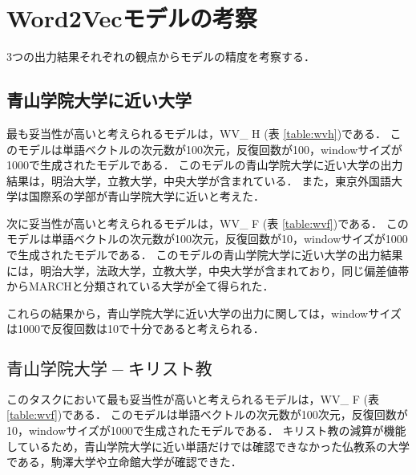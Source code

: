 \section{Word2Vecモデルの考察}
3つの出力結果それぞれの観点からモデルの精度を考察する．

\subsection{青山学院大学に近い大学}
最も妥当性が高いと考えられるモデルは，WV\_ H (表 \ref{table:wvh})である．
このモデルは単語ベクトルの次元数が100次元，反復回数が100，windowサイズが1000で生成されたモデルである．
このモデルの青山学院大学に近い大学の出力結果は，明治大学，立教大学，中央大学が含まれている．
また，東京外国語大学は国際系の学部が青山学院大学に近いと考えた．

次に妥当性が高いと考えられるモデルは，WV\_ F (表 \ref{table:wvf})である．
このモデルは単語ベクトルの次元数が100次元，反復回数が10，windowサイズが1000で生成されたモデルである．
このモデルの青山学院大学に近い大学の出力結果には，明治大学，法政大学，立教大学，中央大学が含まれており，同じ偏差値帯からMARCHと分類されている大学が全て得られた．




これらの結果から，青山学院大学に近い大学の出力に関しては，windowサイズは1000で反復回数は10で十分であると考えられる．

\subsection{$ 青山学院大学 - キリスト教 $}
このタスクにおいて最も妥当性が高いと考えられるモデルは，WV\_ F (表 \ref{table:wvf})である．
このモデルは単語ベクトルの次元数が100次元，反復回数が10，windowサイズが1000で生成されたモデルである．
キリスト教の減算が機能しているため，青山学院大学に近い単語だけでは確認できなかった仏教系の大学である，駒澤大学や立命館大学が確認できた．

